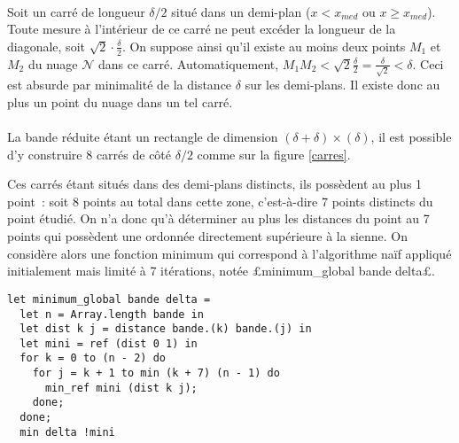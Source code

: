 \documentclass{article}
\begin{document}
  \paragraph{} Soit un carré de longueur $\delta/2$ situé dans un demi-plan ($x < x_{med}$ ou $x \geqslant x_{med}$). Toute mesure à l'intérieur de ce carré ne peut excéder la longueur de la diagonale, soit $\sqrt{2}\cdot\frac{\delta}{2}$. On suppose ainsi qu'il existe au moins deux points $M_1$ et $M_2$ du nuage $\mathcal{N}$ dans ce carré. Automatiquement, $M_1M_2 < \sqrt{2}\frac{\delta}{2} = \frac{\delta}{\sqrt{2}} < \delta$. Ceci est absurde par minimalité de la distance $\delta$ sur les demi-plans. Il existe donc au plus un point du nuage dans un tel carré.


  \paragraph{} La bande réduite étant un rectangle de dimension $(\delta + \delta) \times (\delta)$, il est possible d'y construire 8 carrés de côté $\delta/2$ comme sur la figure \ref{carres}.

  Ces carrés étant situés dans des demi-plans distincts, ils possèdent au plus 1 point~: soit 8 points au total dans cette zone, c'est-à-dire 7 points distincts du point étudié. On n'a donc qu'à déterminer au plus les distances du point au 7 points qui possèdent une ordonnée directement supérieure à la sienne. On considère alors une fonction minimum qui correspond à l'algorithme naïf appliqué initialement mais limité à 7 itérations, notée £minimum_global bande delta£.

  \begin{lstlisting}
let minimum_global bande delta =
  let n = Array.length bande in
  let dist k j = distance bande.(k) bande.(j) in
  let mini = ref (dist 0 1) in
  for k = 0 to (n - 2) do
    for j = k + 1 to min (k + 7) (n - 1) do
      min_ref mini (dist k j);
    done;
  done;
  min delta !mini
  \end{lstlisting}
\end{document}
